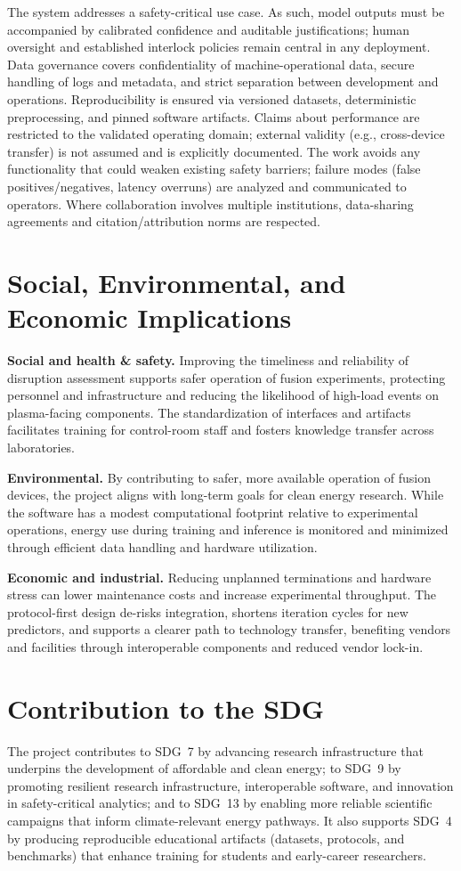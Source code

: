 The system addresses a safety-critical use case. As such, model outputs must be accompanied by calibrated confidence and auditable justifications; human oversight and established interlock policies remain central in any deployment. Data governance covers confidentiality of machine-operational data, secure handling of logs and metadata, and strict separation between development and operations. Reproducibility is ensured via versioned datasets, deterministic preprocessing, and pinned software artifacts. Claims about performance are restricted to the validated operating domain; external validity (e.g., cross-device transfer) is not assumed and is explicitly documented. The work avoids any functionality that could weaken existing safety barriers; failure modes (false positives/negatives, latency overruns) are analyzed and communicated to operators. Where collaboration involves multiple institutions, data-sharing agreements and citation/attribution norms are respected.

\section{Social, Environmental, and Economic Implications}

\textbf{Social and health \& safety.} Improving the timeliness and reliability of disruption assessment supports safer operation of fusion experiments, protecting personnel and infrastructure and reducing the likelihood of high-load events on plasma-facing components. The standardization of interfaces and artifacts facilitates training for control-room staff and fosters knowledge transfer across laboratories.

\textbf{Environmental.} By contributing to safer, more available operation of fusion devices, the project aligns with long-term goals for clean energy research. While the software has a modest computational footprint relative to experimental operations, energy use during training and inference is monitored and minimized through efficient data handling and hardware utilization.

\textbf{Economic and industrial.} Reducing unplanned terminations and hardware stress can lower maintenance costs and increase experimental throughput. The protocol-first design de-risks integration, shortens iteration cycles for new predictors, and supports a clearer path to technology transfer, benefiting vendors and facilities through interoperable components and reduced vendor lock-in.

\section{Contribution to the \acs{SDG}}

The project contributes to \ac{SDG}~7 by advancing research infrastructure that underpins the development of affordable and clean energy; to \ac{SDG}~9 by promoting resilient research infrastructure, interoperable software, and innovation in safety-critical analytics; and to \ac{SDG}~13 by enabling more reliable scientific campaigns that inform climate-relevant energy pathways. It also supports \ac{SDG}~4 by producing reproducible educational artifacts (datasets, protocols, and benchmarks) that enhance training for students and early-career researchers.

